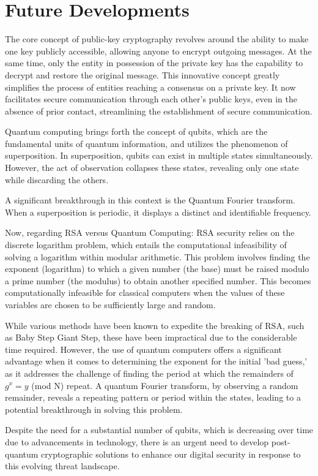 \section{Future Developments}
The core concept of public-key cryptography revolves around the ability to make one key publicly accessible, allowing anyone to encrypt outgoing messages. At the same time, only the entity in possession of the private key has the capability to decrypt and restore the original message. This innovative concept greatly simplifies the process of entities reaching a consensus on a private key. It now facilitates secure communication through each other's public keys, even in the absence of prior contact, streamlining the establishment of secure communication.

Quantum computing brings forth the concept of qubits, which are the fundamental units of quantum information, and utilizes the phenomenon of superposition. In superposition, qubits can exist in multiple states simultaneously. However, the act of observation collapses these states, revealing only one state while discarding the others.

A significant breakthrough in this context is the Quantum Fourier transform. When a superposition is periodic, it displays a distinct and identifiable frequency.

Now, regarding RSA versus Quantum Computing: RSA security relies on the discrete logarithm problem, which entails the computational infeasibility of solving a logarithm within modular arithmetic. This problem involves finding the exponent (logarithm) to which a given number (the base) must be raised modulo a prime number (the modulus) to obtain another specified number. This becomes computationally infeasible for classical computers when the values of these variables are chosen to be sufficiently large and random.

While various methods have been known to expedite the breaking of RSA, such as Baby Step Giant Step, these have been impractical due to the considerable time required. However, the use of quantum computers offers a significant advantage when it comes to determining the exponent for the initial 'bad guess,' as it addresses the challenge of finding the period at which the remainders of $g^x = y$ (mod N) repeat. A quantum Fourier transform, by observing a random remainder, reveals a repeating pattern or period within the states, leading to a potential breakthrough in solving this problem.

Despite the need for a substantial number of qubits, which is decreasing over time due to advancements in technology, there is an urgent need to develop post-quantum cryptographic solutions to enhance our digital security in response to this evolving threat landscape.
